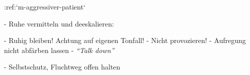 :ref:`m-aggressiver-patient`%
%
\begin{itemize}
  -   Ruhe vermitteln und deeskalieren:
  \begin{itemize}
  -    Ruhig bleiben! Achtung auf eigenen Tonfall!
  -   Nicht provozieren!
  -   Aufregung nicht abfärben lassen
  -   \emph{\enquote{Talk down}}
  \end{itemize}
  -   Selbstschutz, Fluchtweg offen halten
\end{itemize}